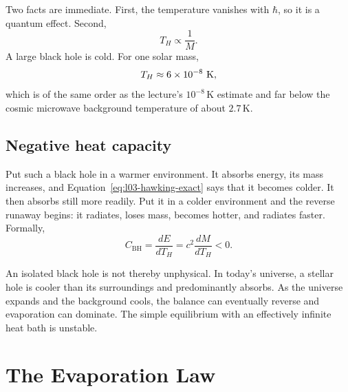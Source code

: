 Two facts are immediate. First, the temperature vanishes with \(\hbar\), so it is a quantum effect. Second,
\begin{equation}
T_H\propto\frac{1}{M}.
\end{equation}
A large black hole is cold. For one solar mass,
\begin{equation}
T_H\approx6\times10^{-8}\ {\rm K},
\end{equation}
which is of the same order as the lecture's \(10^{-8}\,\mathrm{K}\) estimate and far below the cosmic microwave background temperature of about \(2.7\,\mathrm{K}\).

\subsection{Negative heat capacity}

Put such a black hole in a warmer environment. It absorbs energy, its mass increases, and Equation~\eqref{eq:l03-hawking-exact} says that it becomes colder. It then absorbs still more readily. Put it in a colder environment and the reverse runaway begins: it radiates, loses mass, becomes hotter, and radiates faster. Formally,
\begin{equation}
C_{\mathrm{BH}}
=\frac{dE}{dT_H}
=c^2\frac{dM}{dT_H}
<0.
\end{equation}

\begin{classroomqa}
\end{classroomqa}

An isolated black hole is not thereby unphysical. In today's universe, a stellar hole is cooler than its surroundings and predominantly absorbs. As the universe expands and the background cools, the balance can eventually reverse and evaporation can dominate. The simple equilibrium with an effectively infinite heat bath is unstable.

\section{The Evaporation Law}

